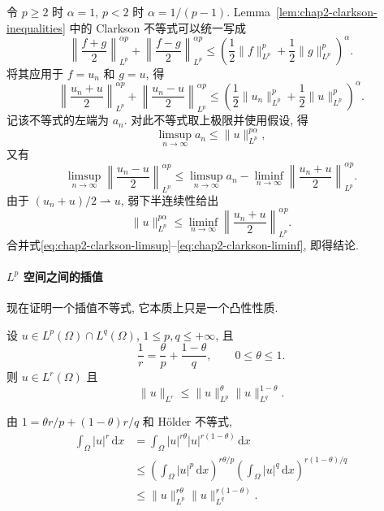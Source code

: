 \begin{Proof}
令 $p\geq2$ 时 $\alpha=1$, $p<2$ 时 $\alpha=1/(p-1)$. Lemma~\ref{lem:chap2-clarkson-inequalities} 中的 Clarkson 不等式可以统一写成
\[
\left\|\frac{f+g}{2}\right\|_{L^p}^{\alpha p}
+\left\|\frac{f-g}{2}\right\|_{L^p}^{\alpha p}
\leq
\left(\frac12\|f\|_{L^p}^p+\frac12\|g\|_{L^p}^p\right)^\alpha.
\]
将其应用于 $f=u_n$ 和 $g=u$, 得
\[
\left\|\frac{u_n+u}{2}\right\|_{L^p}^{\alpha p}
+\left\|\frac{u_n-u}{2}\right\|_{L^p}^{\alpha p}
\leq
\left(\frac12\|u_n\|_{L^p}^p+\frac12\|u\|_{L^p}^p\right)^\alpha.
\]
记该不等式的左端为 $a_n$. 对此不等式取上极限并使用假设, 得
\begin{equation}
 \limsup_{n\to\infty}a_n\leq\|u\|_{L^p}^{p\alpha},
 \label{eq:chap2-clarkson-limsup}
\end{equation}
又有
\begin{equation}
 \limsup_{n\to\infty}\left\|\frac{u_n-u}{2}\right\|_{L^p}^{\alpha p}
 \leq\limsup_{n\to\infty}a_n-
 \liminf_{n\to\infty}\left\|\frac{u_n+u}{2}\right\|_{L^p}^{\alpha p}.
 \label{eq:chap2-clarkson-difference}
\end{equation}
由于 $(u_n+u)/2\rightharpoonup u$, 弱下半连续性给出
\begin{equation}
 \|u\|_{L^p}^{p\alpha}\leq
 \liminf_{n\to\infty}\left\|\frac{u_n+u}{2}\right\|_{L^p}^{\alpha p}.
 \label{eq:chap2-clarkson-liminf}
\end{equation}
合并式\eqref{eq:chap2-clarkson-limsup}--\eqref{eq:chap2-clarkson-liminf}, 即得结论.
\end{Proof}

\paragraph{$L^p$ 空间之间的插值}

现在证明一个插值不等式, 它本质上只是一个凸性性质.

\begin{Lemma}
\label{lem:chap2-lp-interpolation}
设 $u\in L^p(\Omega)\cap L^q(\Omega)$, $1\leq p,q\leq+\infty$, 且
\[
 \frac1r=\frac\theta p+\frac{1-\theta}{q},\qquad0\leq\theta\leq1.
\]
则 $u\in L^r(\Omega)$ 且
\[
 \|u\|_{L^r}\leq\|u\|_{L^p}^\theta\|u\|_{L^q}^{1-\theta}.
\]
\end{Lemma}

\begin{Proof}
由 $1=\theta r/p+(1-\theta)r/q$ 和 H\"older 不等式,
\begin{align*}
\int_\Omega|u|^r\,\mathrm{d}x
&=\int_\Omega|u|^{r\theta}|u|^{r(1-\theta)}\,\mathrm{d}x\\
&\leq\left(\int_\Omega|u|^p\,\mathrm{d}x\right)^{r\theta/p}
\left(\int_\Omega|u|^q\,\mathrm{d}x\right)^{r(1-\theta)/q}\\
&\leq\|u\|_{L^p}^{r\theta}\|u\|_{L^q}^{r(1-\theta)}.
\end{align*}
\end{Proof}

